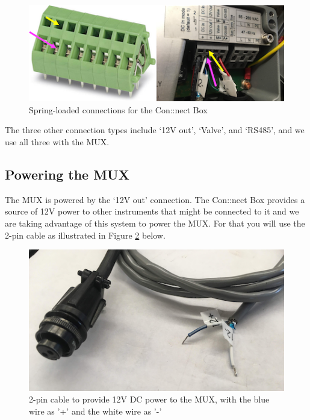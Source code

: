 \documentclass[]{book}
\begin{document}
\begin{figure}

{\centering \includegraphics[width=0.9\linewidth]{pictures/SpringLoadedConnections} 

}

\caption{Spring-loaded connections for the Con::nect Box}\label{fig:SpringLoadedTerminal}
\end{figure}

The three other connection types include `12V out', `Valve', and `RS485', and we use all three with the MUX.

\hypertarget{powering-the-mux}{%
\subsection{Powering the MUX}\label{powering-the-mux}}

The MUX is powered by the `12V out' connection. The Con::nect Box provides a source of 12V power to other instruments that might be connected to it and we are taking advantage of this system to power the MUX. For that you will use the 2-pin cable as illustrated in Figure \ref{fig:2-pin-cable} below.

\begin{figure}

{\centering \includegraphics[width=0.7\linewidth]{pictures/2-pin-cable} 

}

\caption{2-pin cable to provide 12V DC power to the MUX, with the blue wire as '+' and the white wire as '-'}\label{fig:2-pin-cable}
\end{figure}
\end{document}
